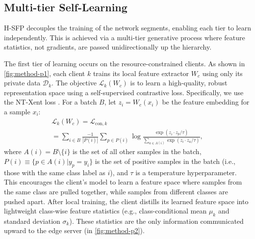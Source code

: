 \subsection{Multi-tier Self-Learning} 
\label{sec:multi_tier_learning}
    H-SFP decouples the training of the network segments, enabling each tier to learn independently. This is achieved via a multi-tier generative process where feature statistics, not gradients, are passed unidirectionally up the hierarchy.
    
    The first tier of learning occurs on the resource-constrained clients. As shown in \cref{fig:method-p1}, each client $k$ trains its local feature extractor $W_c$ using only its private data $\mathcal{D}_k$. The objective $\mathcal{L}_k(W_c)$ is to learn a high-quality, robust representation space using a self-supervised contrastive loss. Specifically, we use the NT-Xent loss \cite{chen2020simple}. For a batch $B$, let $z_i = W_c(x_i)$ be the feature embedding for a sample $x_i$:
    \begin{multline}
        \label{eq:supcon}
        \mathcal{L}_k(W_c) = \mathcal{L}_{\text{con}, k} \\
        = \sum_{i \in B} \frac{-1}{|P(i)|} \sum_{p \in P(i)} \log \frac{\exp(z_i \cdot z_p / \tau)}{\sum_{a \in A(i)} \exp(z_i \cdot z_a / \tau)},
    \end{multline}
    where $A(i) = B \setminus \{i\}$ is the set of all other samples in the batch, $P(i) \equiv \{p \in A(i) | y_p = y_i\}$ is the set of positive samples in the batch (i.e., those with the same class label as $i$), and $\tau$ is a temperature hyperparameter. This encourages the client's model to learn a feature space where samples from the same class are pulled together, while samples from different classes are pushed apart. After local training, the client distills its learned feature space into lightweight class-wise feature statistics (e.g., class-conditional mean $\mu_k$ and standard deviation $\sigma_k$). These statistics are the only information communicated upward to the edge server (in \cref{fig:method-p2}).
    
